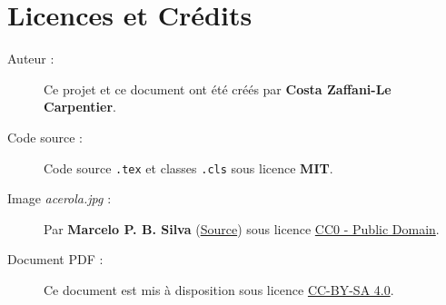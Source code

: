 \section{Licences et Crédits}

\begin{description}
    \item[Auteur :] Ce projet et ce document ont été créés par \textbf{Costa Zaffani-Le Carpentier}.
    \item[Code source :] Code source \texttt{.tex} et classes \texttt{.cls} sous licence \textbf{MIT}.
    \item[Image \textit{acerola.jpg} :] Par \textbf{Marcelo P. B. Silva} (\href{https://commons.wikimedia.org/wiki/File:Acerola_Malpighia_glabra.jpg}{Source}) sous licence \href{https://creativecommons.org/publicdomain/zero/1.0/deed.fr}{CC0 - Public Domain}.
    \item[Document PDF :] Ce document est mis à disposition sous licence \href{https://creativecommons.org/licenses/by-sa/4.0/deed.fr}{CC-BY-SA 4.0}.
\end{description}